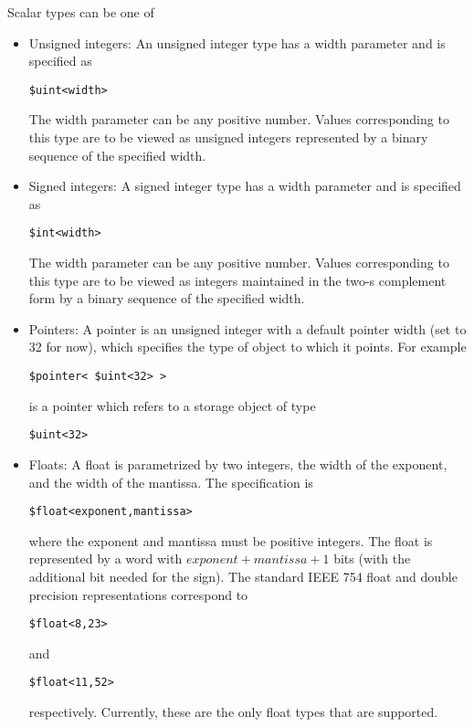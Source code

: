 \documentclass{article}
\begin{document}
Scalar types can be one of 
\begin{itemize}
\item Unsigned integers:  An unsigned integer type
has a width parameter and is specified as 
\begin{verbatim}
$uint<width>
\end{verbatim}
The width parameter can be any positive number.
Values corresponding to this type are to be
viewed as unsigned integers represented by 
a binary sequence of the specified width.
\item Signed integers:  A signed integer type
has a width parameter and is specified as 
\begin{verbatim}
$int<width>
\end{verbatim}
The width parameter can be any positive number.
Values corresponding to this type are to be
viewed as integers maintained in the
two-s complement form  by 
a binary sequence of the specified width.

\item Pointers:  A pointer is an unsigned
integer with a default pointer width
(set to 32 for now), which specifies the
type of object to which it points.
For example
\begin{verbatim}
$pointer< $uint<32> > 
\end{verbatim}
is a pointer which refers to a storage
object of type \begin{verbatim}$uint<32>\end{verbatim}
\item Floats: A float is parametrized by
two integers, the width of the exponent,
and the width of the mantissa.  
The specification is
\begin{verbatim}
$float<exponent,mantissa>
\end{verbatim} %
where the exponent and mantissa must be positive
integers.  The float is represented by 
a word with $exponent+mantissa+1$ bits
(with the additional bit needed for the sign).
The standard IEEE 754 float and double
precision representations correspond
to
\begin{verbatim}
$float<8,23> 
\end{verbatim}
and
\begin{verbatim}
$float<11,52> 
\end{verbatim}
respectively.  Currently, these are the
only float types that are supported.
\end{itemize}
\end{document}

